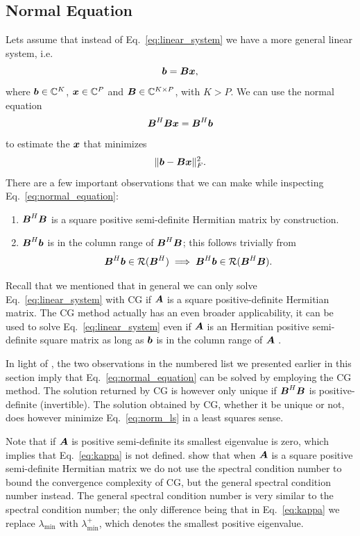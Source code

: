 \documentclass[useAMS,usenatbib]{mn2e}
\newcommand{\bA}{\bmath{A}}
\newcommand{\bB}{\bmath{B}}
\newcommand{\bb}{\bmath{b}}
\newcommand{\bx}{\bmath{x}}
\begin{document}
\subsection{Normal Equation}
Lets assume that instead of Eq.~\eqref{eq:linear_system} we have a more general linear system, i.e.
\begin{equation}
 \bb = \bB\bx,
\end{equation}
where $\bb\in\mathbb{C}^K$, $\bx\in\mathbb{C}^P$  and $\bB\in\mathbb{C}^{K \times P}$, with $K > P$. We can use the normal equation 
\begin{equation}
\label{eq:normal_equation}
\bB^H\bB\bx = \bB^H\bb 
\end{equation}
to estimate the $\bx$ that minimizes
\begin{equation}
\label{eq:norm_ls}
\|\bb-\bB\bx\|_F^2. 
\end{equation}
There are a few important observations that we can make while inspecting Eq.~\eqref{eq:normal_equation}:
\begin{enumerate}
\item $\bB^H\bB$ is a square positive semi-definite Hermitian matrix by construction.
\item $\bB^H\bb$ is in the column range of $\bB^H\bB$; this follows trivially from 
\begin{equation}
\bB^H\bb \in \mathcal{R}(\bB^H) \implies \bB^H\bb \in \mathcal{R}(\bB^H\bB).   
\end{equation}
\end{enumerate}

Recall that we mentioned that in general we can only solve Eq.~\eqref{eq:linear_system} with CG if $\bA$ is a square positive-definite Hermitian matrix. The CG method actually has an even broader applicability, it can be used to solve Eq.~\eqref{eq:linear_system} even if $\bA$ is an Hermitian positive semi-definite
square matrix as long as $\bb$ is in the column range of $\bA$ \citep{Lu2015}.

In light of \citet{Lu2015}, the two observations in the numbered list we presented earlier in this section imply that Eq.~\eqref{eq:normal_equation}
can be solved by employing the CG method. The solution returned by CG is however only unique if $\bB^H\bB$ is positive-definite (invertible). The solution
obtained by CG, whether it be unique or not, does however minimize Eq.~\eqref{eq:norm_ls} in a least squares sense.

Note that if $\bA$ is positive semi-definite its smallest eigenvalue is zero, which implies that Eq.~\eqref{eq:kappa} is not defined. \citet{Lu2015} show that when $\bA$
is a square positive semi-definite Hermitian matrix we do not use the spectral condition number to bound the convergence complexity of CG, but the general spectral condition
number instead. The general spectral condition number is very similar to the spectral condition number; the only difference being that in Eq.~\eqref{eq:kappa} we replace  
$\lambda_{\textrm{min}}$ with $\lambda_{\textrm{min}}^+$, which denotes the smallest positive eigenvalue. 
\end{document}
